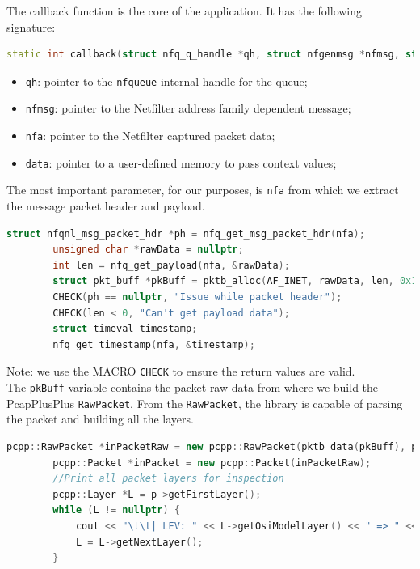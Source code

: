 \documentclass[12pt]{article}
\begin{document}
	The callback function is the core of the application. It has the following signature:
	\bigbreak
	
	\begin{lstlisting}[frame=single, language=C++]
		static int callback(struct nfq_q_handle *qh, struct nfgenmsg *nfmsg, struct nfq_data *nfa, void *data);
	\end{lstlisting}
	\bigbreak

	\begin{itemize}
		\item \lstinline{qh}: pointer to the \lstinline{nfqueue} internal handle for the queue;
		\item \lstinline{nfmsg}: pointer to the Netfilter address family dependent message;
		\item \lstinline{nfa}: pointer to the Netfilter captured packet data;
		\item \lstinline{data}: pointer to a user-defined memory to pass context values;
	\end{itemize}
	\bigbreak

	The most important parameter, for our purposes, is \lstinline{nfa} from which we extract the message packet header and payload.\\
	\bigbreak

	\begin{lstlisting}[frame=single, language=C++]
		struct nfqnl_msg_packet_hdr *ph = nfq_get_msg_packet_hdr(nfa);
		unsigned char *rawData = nullptr;
		int len = nfq_get_payload(nfa, &rawData);
		struct pkt_buff *pkBuff = pktb_alloc(AF_INET, rawData, len, 0x1000);
		CHECK(ph == nullptr, "Issue while packet header");
		CHECK(len < 0, "Can't get payload data");
		struct timeval timestamp;
		nfq_get_timestamp(nfa, &timestamp);
	\end{lstlisting}

	Note: we use the MACRO \lstinline{CHECK} to ensure the return values are valid.\\
	\bigbreak
	The \lstinline{pkBuff} variable contains the packet raw data from where we build the PcapPlusPlus \lstinline{RawPacket}. From the \lstinline{RawPacket}, the library is capable of parsing the packet and building all the layers.\\
	\bigbreak

	\begin{lstlisting}[frame=single, language=C++]
		pcpp::RawPacket *inPacketRaw = new pcpp::RawPacket(pktb_data(pkBuff), pktb_len(pkBuff), timestamp, false, pcpp::LINKTYPE_RAW);
		pcpp::Packet *inPacket = new pcpp::Packet(inPacketRaw);
		//Print all packet layers for inspection
		pcpp::Layer *L = p->getFirstLayer();
		while (L != nullptr) {
			cout << "\t\t| LEV: " << L->getOsiModelLayer() << " => " << L->toString() << endl;
			L = L->getNextLayer();
		}
	\end{lstlisting}
	\bigbreak
\end{document}
